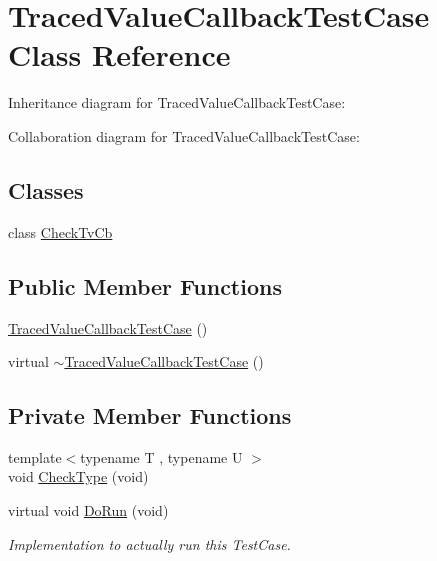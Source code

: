 \hypertarget{classTracedValueCallbackTestCase}{}\section{Traced\+Value\+Callback\+Test\+Case Class Reference}
\label{classTracedValueCallbackTestCase}


Inheritance diagram for Traced\+Value\+Callback\+Test\+Case\+:


Collaboration diagram for Traced\+Value\+Callback\+Test\+Case\+:
\subsection*{Classes}
\begin{DoxyCompactItemize}
\item 
class \hyperlink{classTracedValueCallbackTestCase_1_1CheckTvCb}{Check\+Tv\+Cb}
\end{DoxyCompactItemize}
\subsection*{Public Member Functions}
\begin{DoxyCompactItemize}
\item 
\hyperlink{classTracedValueCallbackTestCase_aef07c24607d2911946e35faa70bd5c27}{Traced\+Value\+Callback\+Test\+Case} ()
\item 
virtual \hyperlink{classTracedValueCallbackTestCase_a7d9172dea1c296ccdff56d39eb94687e}{$\sim$\+Traced\+Value\+Callback\+Test\+Case} ()
\end{DoxyCompactItemize}
\subsection*{Private Member Functions}
\begin{DoxyCompactItemize}
\item 
{\footnotesize template$<$typename T , typename U $>$ }\\void \hyperlink{classTracedValueCallbackTestCase_a871d98500f016581a696d6515459609e}{Check\+Type} (void)
\item 
virtual void \hyperlink{classTracedValueCallbackTestCase_a60b6991ea242e3a2d1ddfe14122346e5}{Do\+Run} (void)
\begin{DoxyCompactList}\small\item\em Implementation to actually run this Test\+Case. \end{DoxyCompactList}\end{DoxyCompactItemize}
